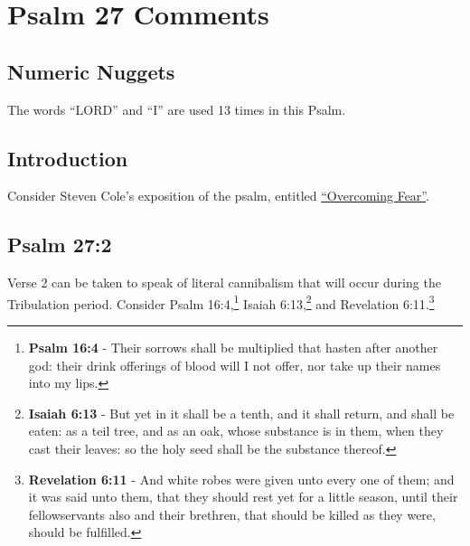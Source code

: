 \section{Psalm 27 Comments}

\subsection{Numeric Nuggets}
The words ``LORD'' and ``I'' are used 13 times in this Psalm. 

\subsection{Introduction}
Consider Steven Cole's exposition of the psalm, entitled \href{https://bible.org/seriespage/psalm-27-overcoming-fear}{``Overcoming Fear''}.

\subsection{Psalm 27:2}
Verse 2 can be taken to speak of literal cannibalism that will occur during the Tribulation period. Consider Psalm 16:4,\footnote{\textbf{Psalm 16:4} - Their sorrows shall be multiplied that hasten after another god: their drink offerings of blood will I not offer, nor take up their names into my lips.} Isaiah 6:13,\footnote{\textbf{Isaiah 6:13} - But yet in it shall be a tenth, and it shall return, and shall be eaten: as a teil tree, and as an oak, whose substance is in them, when they cast their leaves: so the holy seed shall be the substance thereof.} and Revelation 6:11.\footnote{\textbf{Revelation 6:11} - And white robes were given unto every one of them; and it was said unto them, that they should rest yet for a little season, until their fellowservants also and their brethren, that should be killed as they were, should be fulfilled.}\cite{Ruckman1992PsalmsV1} 